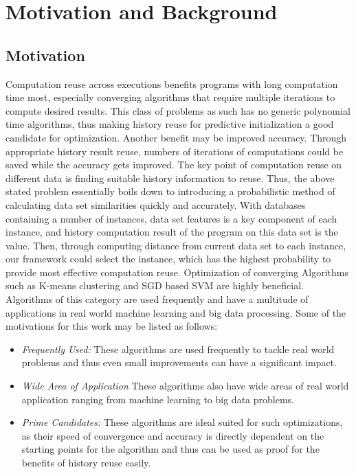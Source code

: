\chapter{Motivation and Background}
\label{chap-two}
\section{Motivation}
Computation reuse across executions benefits programs with long computation time most, especially converging algorithms that require multiple iterations to compute desired results. This class of problems as such has no generic polynomial time algorithms, thus making history reuse for predictive initialization a good candidate for optimization. Another benefit may be improved accuracy. Through appropriate history result reuse, numbers of iterations of computations could be saved while the accuracy gets improved. The key point of computation reuse on different data is finding suitable history information to reuse. Thus, the above stated problem essentially boils down to introducing a probabilistic method of calculating data set similarities quickly and accurately. With databases containing a number of instances, data set features is a key component of each instance, and history computation result of the program on this data set is the value. Then, through computing distance from current data set to each instance, our framework could select the instance, which has the highest probability to provide most effective computation reuse.
Optimization of converging Algorithms such as K-means clustering and SGD based SVM are highly beneficial. Algorithms of this category are used frequently and have a multitude of applications in real world machine learning and big data processing.  Some of the motivations for this work may be listed as follows:
\begin{itemize}
	\item \textit{Frequently Used:} These algorithms are used frequently to tackle real world problems and thus even small improvements can have a significant impact.
	\item \textit{Wide Area of Application} These algorithms also have wide areas of real world application ranging from machine learning to big data problems.
	\item \textit{Prime Candidates:} These algorithms are ideal suited for such optimizations, as their speed of convergence and accuracy is directly dependent on the starting points for the algorithm and thus can be used as proof for the benefits of history reuse easily.
\end{itemize}
